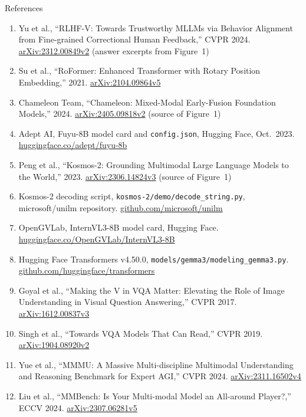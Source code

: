 \begin{frame}[allowframebreaks]{References}
\begin{enumerate}
    \item Yu et al., ``RLHF-V: Towards Trustworthy MLLMs via Behavior Alignment from Fine-grained Correctional Human Feedback,'' CVPR 2024. \href{https://arxiv.org/abs/2312.00849v2}{arXiv:2312.00849v2} (answer excerpts from Figure~1)
    \item Su et al., ``RoFormer: Enhanced Transformer with Rotary Position Embedding,'' 2021. \href{https://arxiv.org/abs/2104.09864v5}{arXiv:2104.09864v5}
    \item Chameleon Team, ``Chameleon: Mixed-Modal Early-Fusion Foundation Models,'' 2024. \href{https://arxiv.org/abs/2405.09818v2}{arXiv:2405.09818v2} (source of Figure~1)
    \item Adept AI, Fuyu-8B model card and \texttt{config.json}, Hugging Face, Oct.\ 2023. \href{https://huggingface.co/adept/fuyu-8b}{huggingface.co/adept/fuyu-8b}
    \item Peng et al., ``Kosmos-2: Grounding Multimodal Large Language Models to the World,'' 2023. \href{https://arxiv.org/abs/2306.14824v3}{arXiv:2306.14824v3} (source of Figure~1)
    \item Kosmos-2 decoding script, \texttt{kosmos-2/demo/decode\_string.py}, microsoft/unilm repository. \href{https://github.com/microsoft/unilm/blob/97e4923e97d3ee10b57e97013556e3fd0d207a9b/kosmos-2/demo/decode_string.py}{github.com/microsoft/unilm}
    \item OpenGVLab, InternVL3-8B model card, Hugging Face. \href{https://huggingface.co/OpenGVLab/InternVL3-8B}{huggingface.co/OpenGVLab/InternVL3-8B}
    \item Hugging Face Transformers v4.50.0, \texttt{models/gemma3/modeling\_gemma3.py}. \href{https://github.com/huggingface/transformers/blob/v4.50.0/src/transformers/models/gemma3/modeling_gemma3.py}{github.com/huggingface/transformers}
    \item Goyal et al., ``Making the V in VQA Matter: Elevating the Role of Image Understanding in Visual Question Answering,'' CVPR 2017. \href{https://arxiv.org/abs/1612.00837v3}{arXiv:1612.00837v3}
    \item Singh et al., ``Towards VQA Models That Can Read,'' CVPR 2019. \href{https://arxiv.org/abs/1904.08920v2}{arXiv:1904.08920v2}
    \item Yue et al., ``MMMU: A Massive Multi-discipline Multimodal Understanding and Reasoning Benchmark for Expert AGI,'' CVPR 2024. \href{https://arxiv.org/abs/2311.16502v4}{arXiv:2311.16502v4}
    \item Liu et al., ``MMBench: Is Your Multi-modal Model an All-around Player?,'' ECCV 2024. \href{https://arxiv.org/abs/2307.06281v5}{arXiv:2307.06281v5}

\end{enumerate}
\end{frame}
